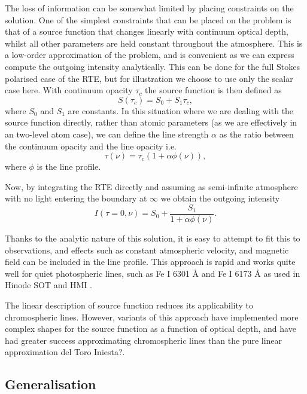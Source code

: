 The loss of information can be somewhat limited by placing constraints on the solution. One of the simplest constraints that can be placed on the problem is that of a source function that changes linearly with continuum optical depth, whilst all other parameters are held constant throughout the atmosphere.
This is a low-order approximation of the problem, and is convenient as we can express compute the outgoing intensity analytically.
This can be done for the full Stokes polarised case of the RTE, but for illustration we choose to use only the scalar case here.
With continuum opacity $\tau_c$ the source function is then defined as
\begin{equation}
    S(\tau_c) = S_0 + S_1 \tau_c,
\end{equation}
where $S_0$ and $S_1$ are constants.
In this situation where we are dealing with the source function directly, rather than atomic parameters (as we are effectively in an two-level atom case), we can define the line strength $\alpha$ as the ratio between the continuum opacity and the line opacity i.e.
\begin{equation}
    \tau(\nu) = \tau_c (1 + \alpha \phi(\nu)),
\end{equation}
where $\phi$ is the line profile.

Now, by integrating the RTE directly and assuming as semi-infinite atmosphere with no light entering the boundary at $\infty$ we obtain the outgoing intensity
\begin{equation}
I(\tau=0, \nu) = S_0 + \frac{S_1}{1 + \alpha\phi(\nu)}.
\end{equation}

Thanks to the analytic nature of this solution, it is easy to attempt to fit this to observations, and effects such as constant atmospheric velocity, and magnetic field can be included in the line profile.
This approach is rapid and works quite well for quiet photospheric lines, such as Fe I 6301 \AA{} and Fe I 6173 \AA{} as used in Hinode SOT and HMI \citep[e.g.][]{Centeno2014}.

The linear description of source function reduces its applicability to chromospheric lines.
However, variants of this approach have implemented more complex shapes for the source function as a function of optical depth, and have had greater success approximating chromospheric lines than the pure linear approximation \NeedRef{} del Toro Iniesta?.

\subsection{Generalisation}

